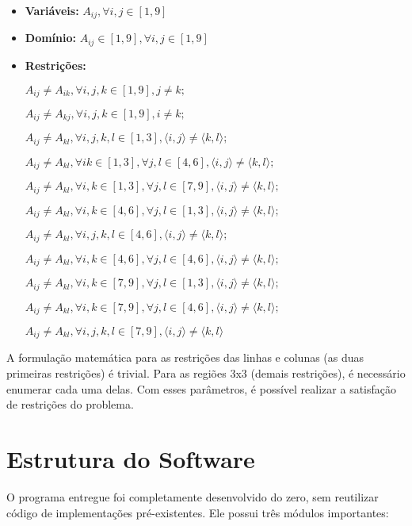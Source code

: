 \documentclass[journal,transmag]{IEEEtran}
\begin{document}
\begin{itemize}
\item \textbf{Variáveis:}
$A_{ij}, \forall i, j \in [1, 9] $
\item \textbf{Domínio:}
$A_{ij} \in [1, 9], \forall i, j \in [1, 9]$
\item \textbf{Restrições:}

$A_{ij} \neq A_{ik}, \forall i, j, k \in [1, 9], j \neq k;$

$A_{ij} \neq A_{kj}, \forall i, j, k \in [1, 9], i \neq k;$

$A_{ij} \neq A_{kl}, \forall i, j, k, l \in [1, 3], \langle i, j \rangle \neq \langle k, l \rangle;$

$A_{ij} \neq A_{kl}, \forall i k \in [1, 3], \forall j, l \in [4, 6], \langle i, j \rangle \neq \langle k, l \rangle;$

$A_{ij} \neq A_{kl}, \forall i, k \in [1, 3], \forall j, l \in [7, 9], \langle i, j \rangle \neq \langle k, l \rangle;$

$A_{ij} \neq A_{kl}, \forall i, k \in [4, 6], \forall j, l \in [1, 3], \langle i, j \rangle \neq \langle k, l \rangle;$

$A_{ij} \neq A_{kl}, \forall i, j, k, l \in [4, 6], \langle i, j \rangle \neq \langle k, l \rangle;$

$A_{ij} \neq A_{kl}, \forall i, k \in [4, 6], \forall j, l \in [4, 6], \langle i, j \rangle \neq \langle k, l \rangle;$

$A_{ij} \neq A_{kl}, \forall i, k \in [7, 9], \forall j, l \in [1, 3], \langle i, j \rangle \neq \langle k, l \rangle;$

$A_{ij} \neq A_{kl}, \forall i, k \in [7, 9], \forall j, l \in [4, 6], \langle i, j \rangle \neq \langle k, l \rangle;$

$A_{ij} \neq A_{kl}, \forall i, j, k, l \in [7, 9], \langle i, j \rangle \neq \langle k, l \rangle$
\end{itemize}

A formulação matemática para as restrições das linhas e colunas (as duas
primeiras restrições) é trivial. Para as regiões 3x3 (demais restrições), é
necessário enumerar cada uma delas. Com esses parâmetros, é possível realizar a
satisfação de restrições do problema.

\section{Estrutura do Software}
O programa entregue foi completamente desenvolvido do zero, sem reutilizar
código de implementações pré-existentes. Ele possui três módulos importantes:
\end{document}
